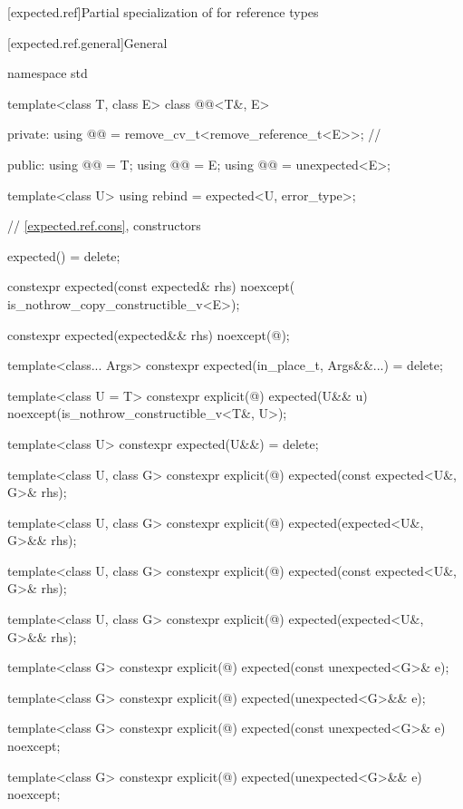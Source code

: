 [expected.ref]{Partial specialization of  for reference types}

[expected.ref.general]{General}

\begin{codeblock}
namespace std {
  template<class T, class E>
  class @@<T&, E> {
  private:
    using @@ = remove_cv_t<remove_reference_t<E>>; // \expos

  public:
    using @@ = T;
    using @@ = E;
    using @@ = unexpected<E>;

    template<class U> using rebind = expected<U, error_type>;

    // \ref{expected.ref.cons}, constructors

    expected() = delete;

    constexpr expected(const expected& rhs) noexcept(
        is_nothrow_copy_constructible_v<E>);

    constexpr expected(expected&& rhs) noexcept(@\seebelow@);

    template<class... Args> constexpr expected(in_place_t, Args&&...) = delete;

    template<class U = T>
    constexpr explicit(@\seebelow@)
        expected(U&& u) noexcept(is_nothrow_constructible_v<T&, U>);

    template<class U> constexpr expected(U&&) = delete;

    template<class U, class G>
    constexpr explicit(@\seebelow@) expected(const expected<U&, G>& rhs);

    template<class U, class G>
    constexpr explicit(@\seebelow@) expected(expected<U&, G>&& rhs);

    template<class U, class G>
    constexpr explicit(@\seebelow@) expected(const expected<U&, G>& rhs);

    template<class U, class G>
    constexpr explicit(@\seebelow@) expected(expected<U&, G>&& rhs);

    template<class G> constexpr explicit(@\seebelow@) expected(const unexpected<G>& e);

    template<class G> constexpr explicit(@\seebelow@) expected(unexpected<G>&& e);

    template<class G>
    constexpr explicit(@\seebelow@) expected(const unexpected<G>& e) noexcept;

    template<class G> constexpr explicit(@\seebelow@) expected(unexpected<G>&& e) noexcept;

}}
\end{codeblock}
